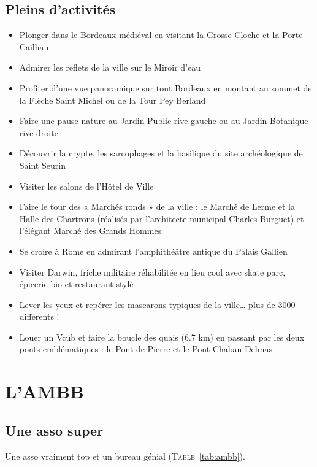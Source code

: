 \documentclass[10 pt]{report} %
\begin{document}
    \section{Pleins d'activités}
        \begin{itemize}
            \item Plonger dans le Bordeaux médiéval en visitant la Grosse Cloche et la Porte Cailhau
            \item Admirer les reflets de la ville sur le Miroir d’eau
            \item Profiter d’une vue panoramique sur tout Bordeaux en montant au sommet de la Flèche Saint Michel ou de la Tour Pey Berland
            \item Faire une pause nature au Jardin Public rive gauche ou au Jardin Botanique rive droite
            \item Découvrir la crypte, les sarcophages et la basilique du site archéologique de Saint Seurin
            \item Visiter les salons de l’Hôtel de Ville
            \item Faire le tour des « Marchés ronds » de la ville : le Marché de Lerme et la Halle des Chartrons (réalisés par l’architecte municipal Charles Burguet) et l’élégant Marché des Grands Hommes
            \item Se croire à Rome en admirant l’amphithéâtre antique du Palais Gallien
            \item Visiter Darwin, friche militaire réhabilitée en lieu cool avec skate parc, épicerie bio et restaurant stylé
            \item Lever les yeux et repérer les mascarons typiques de la ville… plus de 3000 différents !
            \item Louer un Vcub et faire la boucle des quais (6.7 km) en passant par les deux ponts emblématiques : le Pont de Pierre et le Pont Chaban-Delmas
        \end{itemize}
\chapter{L'AMBB}
    \section{Une asso super}
    
        Une asso vraiment top et un bureau génial (\textsc{Table}~\ref{tab:ambb}).
        
\end{document}
